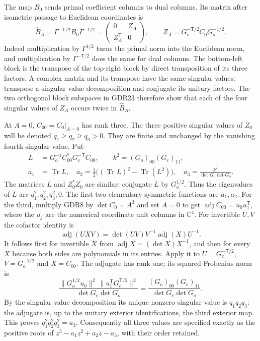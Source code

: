 \documentclass[11pt]{article}
\newcommand{\C}{\mathbb C}
\providecommand{\Tr}{\operatorname{Tr}}
\providecommand{\Tr}{\operatorname{Tr}}
\begin{document}
The map $B_0$ sends primal coefficient columns to dual columns.
Its matrix after isometric passage to Euclidean coordinates is
\begin{equation}
 \widehat B_A=\Gamma^{-\mathsf T/2}B_0\Gamma^{-1/2}
  =\begin{pmatrix}0&Z_A\\Z_A^{\mathsf T}&0\end{pmatrix},
 \qquad Z_A=G_e^{-\mathsf T/2}C_0G_o^{-1/2}.
 \tag{GDR23}
\end{equation}
Indeed multiplication by $\Gamma^{1/2}$ turns the primal norm
into the Euclidean norm, and multiplication by
$\Gamma^{-\mathsf T/2}$ does the same for dual columns.
The bottom-left block is the transpose of the top-right block
by direct transposition of its three factors. A complex matrix
and its transpose have the same singular values: transpose a
singular value decomposition and conjugate its unitary factors.
The two orthogonal block subspaces in GDR23 therefore show
that each of the four singular values of $Z_A$ occurs twice
in $\widehat B_A$.

At $A=0$, $C_{00}=C_0|_{A=0}$ has rank three. The three
positive singular values of $Z_0$ will be denoted
$q_1\ge q_2\ge q_3>0$. They are finite and unchanged by
the vanishing fourth singular value. Put
\begin{equation}
 \begin{aligned}
 L&=G_o^{-1}C_{00}^*G_e^{-\mathsf T}C_{00},\qquad
 k^2=(G_o)_{00}(G_e)_{11},\\
 a_1&=\Tr L,\quad
 a_2=\tfrac12\big((\Tr L)^2-\Tr(L^2)\big),\quad
 a_3=\frac{k^2}{\det G_e\det G_o}.
 \end{aligned}
 \tag{GDR24}
\end{equation}
The matrices $L$ and $Z_0^*Z_0$ are similar: conjugate $L$
by $G_o^{1/2}$. Thus the eigenvalues of $L$ are
$q_1^2,q_2^2,q_3^2,0$. The first two elementary symmetric
functions are $a_1,a_2$. For the third, multiply GDR8 by
$\det C_0=A^3$ and set $A=0$ to get
$\operatorname{adj}C_{00}=u_0u_1^{\mathsf T}$, where the
$u_j$ are the numerical coordinate unit columns in $\C^4$.
For invertible $U,V$ the cofactor identity is
\[
 \operatorname{adj}(UXV)=\det(UV)V^{-1}
          \operatorname{adj}(X)U^{-1}.
\]
It follows first for invertible $X$ from
$\operatorname{adj}X=(\det X)X^{-1}$, and then for every
$X$ because both sides are polynomials in its entries.
Apply it to $U=G_e^{-\mathsf T/2}$, $V=G_o^{-1/2}$
and $X=C_{00}$. The adjugate has rank one; its squared
Frobenius norm is
\[
 \frac{\|G_o^{1/2}u_0\|^2\,
        \|u_1^{\mathsf T}G_e^{\mathsf T/2}\|^2}
      {\det G_e\det G_o}
 =\frac{(G_o)_{00}(G_e)_{11}}{\det G_e\det G_o}.
\]
By the singular value decomposition its unique nonzero
singular value is $q_1q_2q_3$: the adjugate is, up to the
unitary exterior identifications, the third exterior map.
This proves $q_1^2q_2^2q_3^2=a_3$. Consequently all three
values are specified exactly as the positive roots of
$z^3-a_1z^2+a_2z-a_3$, with their order retained.
\end{document}

